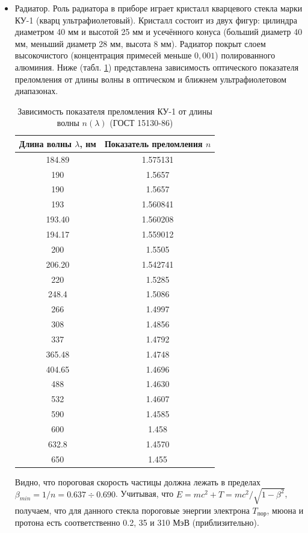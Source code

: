 \documentclass[12pt,a4paper]{report} %
\begin{document}
\begin{itemize}
	\item Радиатор. Роль радиатора в приборе играет кристалл кварцевого стекла марки КУ-1 (кварц ультрафиолетовый). Кристалл состоит из двух фигур: цилиндра диаметром 40 мм и высотой 25 мм и усечённого конуса (больший диаметр 40 мм, меньший диаметр 28 мм, высота 8 мм). Радиатор покрыт слоем высокочистого (концентрация примесей меньше $0,001$) полированного алюминия. Ниже (табл. \ref{tab:optical}) представлена зависимость оптического показателя преломления от длины волны в оптическом и ближнем ультрафиолетовом диапазонах. 
\begin{table}[bh]
		\caption{\label{tab:optical}Зависимость показателя преломления КУ-1 от длины волны $n(\lambda)$ (ГОСТ 15130-86)}
		\begin{center}
		\begin{tabular}{|c|c|}
		\hline
		Длина волны $\lambda$, нм & Показатель преломления $n$ \\
		\hline
		184.89&1.575131 \\
		190&1.5657 \\
		190 &1.5657 \\
		193&1.560841\\
		193.40&1.560208\\
		194.17&1.559012\\
		200&1.5505\\
		206.20&1.542741\\
		220&1.5285\\
		248.4&1.5086\\
		266&1.4997\\
		308&1.4856\\
		337&1.4792\\
		365.48&1.4748\\
		404.65&1.4696\\
		488&1.4630\\
		532&1.4607\\
		590&1.4585\\
		600&1.458\\
		632.8&1.4570\\
		650&1.455\\
		\hline
		\end{tabular}
		\end{center}
	\end{table} 
Видно, что пороговая скорость частицы должна лежать в пределах $\beta_{min}= 1/n = 0.637 \div 0.690$. Учитывая, что $E=mc^2+T = mc^2/\sqrt{1-\beta^2}$, получаем, что для данного стекла пороговые энергии электрона $T_{пор}$, мюона и протона есть соответственно 0.2, 35 и 310 МэВ (приблизительно).

\end{itemize}
\end{document}

